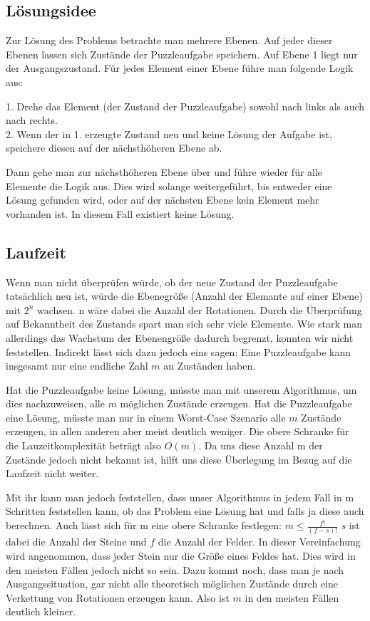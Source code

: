 \subsection {Lösungsidee}
	Zur Lösung des Problems betrachte man mehrere Ebenen. Auf jeder dieser Ebenen lassen sich Zustände der Puzzleaufgabe speichern. 
	Auf Ebene 1 liegt nur der Ausgangszustand. Für jedes Element einer Ebene führe man folgende Logik aus:

	1. Drehe das Element (der Zustand der Puzzleaufgabe) sowohl nach links als auch nach rechts.\\
	2. Wenn der in 1. erzeugte Zustand neu und keine Lösung der Aufgabe ist, speichere diesen auf der nächsthöheren Ebene ab.

	Dann gehe man zur nächsthöheren Ebene über und führe wieder für alle Elemente die Logik aus.
	Dies wird solange weitergeführt, bis entweder eine Lösung gefunden wird, oder auf der nächsten Ebene kein Element mehr vorhanden ist.
	In diesem Fall existiert keine Lösung.

	
\subsection{Laufzeit}
	Wenn man nicht überprüfen würde, ob der neue Zustand der Puzzleaufgabe tatsächlich neu ist, würde die Ebenegröße (Anzahl der Elemante auf einer Ebene) mit \(2^n\) wachsen.  
	n wäre dabei die Anzahl der Rotationen. Durch die Überprüfung auf Bekanntheit des Zustands spart man sich sehr viele Elemente. 
	Wie stark man allerdings das Wachstum der Ebenengröße dadurch begrenzt, konnten wir nicht feststellen. Indirekt lässt sich dazu jedoch eins sagen: 
	Eine Puzzleaufgabe kann insgesamt nur eine endliche Zahl \(m\) an Zuständen haben. 

	Hat die Puzzleaufgabe keine Lösung, müsste man mit unserem Algorithmus, um dies nachzuweisen, alle \(m\) möglichen Zustände erzeugen.
	Hat die Puzzleaufgabe eine Lösung, müsste man nur in einem Worst-Case Szenario alle \(m\) Zustände erzeugen, in allen anderen aber meist deutlich weniger.
	Die obere Schranke für die Lauzeitkomplexität beträgt also \(O(m)\). Da uns diese Anzahl m der Zustände jedoch nicht bekannt ist, 
	hilft uns diese Überlegung im Bezug auf die Laufzeit nicht weiter. 

	Mit ihr kann man jedoch feststellen, dass unser Algorithmus in jedem Fall in m Schritten feststellen kann, ob das Problem eine Lösung hat und falls ja diese auch berechnen. 
	Auch lässt sich für m eine obere Schranke festlegen: \(m \le \frac{f!}{(f-s)!}\) \(s\) ist dabei die Anzahl der Steine und \(f\) die Anzahl der Felder. 
	In dieser Vereinfachung wird angenommen, dass jeder Stein nur die Größe eines Feldes hat. Dies wird in den meisten Fällen jedoch nicht so sein.
	Dazu kommt noch, dass man je nach Ausgangssituation, 
	gar nicht alle theoretisch möglichen Zustände durch eine Verkettung von Rotationen erzeugen kann. 
	Also ist \(m\) in den meisten Fällen deutlich kleiner. 

